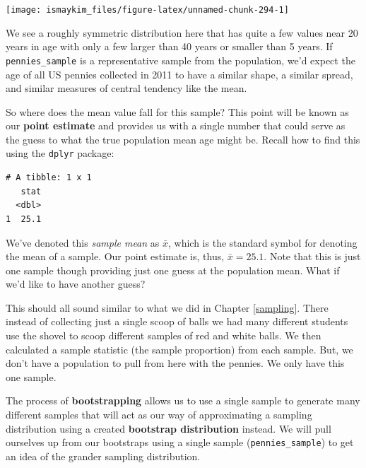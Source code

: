 \documentclass[12pt,]{krantz}
\makeatletter
\newenvironment{Shaded}{\begin{snugshade}}{\end{snugshade}}
\newcommand{\KeywordTok}[1]{\textcolor[rgb]{0.27,0.27,0.27}{\textbf{#1}}}
\newcommand{\DataTypeTok}[1]{\textcolor[rgb]{0.27,0.27,0.27}{#1}}
\newcommand{\DecValTok}[1]{\textcolor[rgb]{0.06,0.06,0.06}{#1}}
\newcommand{\StringTok}[1]{\textcolor[rgb]{0.5,0.5,0.5}{#1}}
\newcommand{\OperatorTok}[1]{\textcolor[rgb]{0.43,0.43,0.43}{\textbf{#1}}}
\newcommand{\NormalTok}[1]{#1}
\newenvironment{kframe}{%
\medskip{}
\setlength{\fboxsep}{.8em}
 \def\at@end@of@kframe{}%
 \ifinner\ifhmode%
  \def\at@end@of@kframe{\end{minipage}}%
  \begin{minipage}{\columnwidth}%
 \fi\fi%
 \def\FrameCommand##1{\hskip\@totalleftmargin \hskip-\fboxsep
 \colorbox{shadecolor}{##1}\hskip-\fboxsep
     \hskip-\linewidth \hskip-\@totalleftmargin \hskip\columnwidth}%
 \MakeFramed {\advance\hsize-\width
   \@totalleftmargin\z@ \linewidth\hsize
   \@setminipage}}%
 {\par\unskip\endMakeFramed%
 \at@end@of@kframe}
\renewenvironment{Shaded}{\begin{kframe}}{\end{kframe}}
\theoremstyle{definition}
\theoremstyle{definition}
\theoremstyle{definition}
\theoremstyle{remark}
\makeatother
\begin{document}
\begin{center}\texttt{[image: ismaykim\_files/figure-latex/unnamed-chunk-294-1]} \end{center}

We see a roughly symmetric distribution here that has quite a few values
near 20 years in age with only a few larger than 40 years or smaller
than 5 years. If \texttt{pennies\_sample} is a representative sample
from the population, we'd expect the age of all US pennies collected in
2011 to have a similar shape, a similar spread, and similar measures of
central tendency like the mean.

So where does the mean value fall for this sample? This point will be
known as our \textbf{point estimate} and provides us with a single
number that could serve as the guess to what the true population mean
age might be. Recall how to find this using the \texttt{dplyr} package:

\begin{Shaded}
\end{Shaded}

\begin{verbatim}
# A tibble: 1 x 1
   stat
  <dbl>
1  25.1
\end{verbatim}

We've denoted this \emph{sample mean} as \(\bar{x}\), which is the
standard symbol for denoting the mean of a sample. Our point estimate
is, thus, \(\bar{x} = 25.1\). Note that this is just one sample though
providing just one guess at the population mean. What if we'd like to
have another guess?

This should all sound similar to what we did in Chapter \ref{sampling}.
There instead of collecting just a single scoop of balls we had many
different students use the shovel to scoop different samples of red and
white balls. We then calculated a sample statistic (the sample
proportion) from each sample. But, we don't have a population to pull
from here with the pennies. We only have this one sample.

The process of \textbf{bootstrapping} allows us to use a single sample
to generate many different samples that will act as our way of
approximating a sampling distribution using a created \textbf{bootstrap
distribution} instead. We will pull ourselves up from our bootstraps
using a single sample (\texttt{pennies\_sample}) to get an idea of the
grander sampling distribution.
\end{document}
